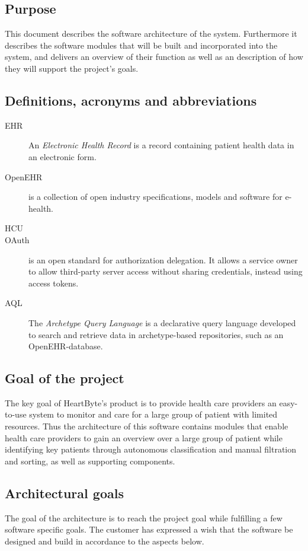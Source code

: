 \documentclass{article}
\begin{document}
\subsection{Purpose}
This document describes the software architecture of the system. Furthermore it describes the software modules that will be built and incorporated into the system, and delivers an overview of their function as well as an description of how they will support the project's goals.

\subsection{Definitions, acronyms and abbreviations}
\begin{description}
\item [EHR] An \emph{Electronic Health Record} is a record containing patient health data in an electronic form.
\item [OpenEHR] is a collection of open industry specifications, models and software for e-health.
\item [HCU] 
\item [OAuth] is an open standard for authorization delegation. It allows a service owner to allow third-party server access without sharing credentials, instead using access tokens. 
\item [AQL] The \emph{Archetype Query Language} is a declarative query language developed to search and retrieve data in archetype-based repositories, such as an OpenEHR-database.
\end{description}

\subsection{Goal of the project}
The key goal of HeartByte's product is to provide health care providers an easy-to-use system to monitor and care for a large group of patient with limited resources. Thus the architecture of this software contains modules that enable health care providers to gain an overview over a large group of patient while identifying key patients through autonomous classification and manual filtration and sorting, as well as supporting components.

\subsection{Architectural goals}
The goal of the architecture is to reach the project goal while fulfilling a few software specific goals. The customer has expressed a wish that the software be designed and build in accordance to the aspects below.
\end{document}
